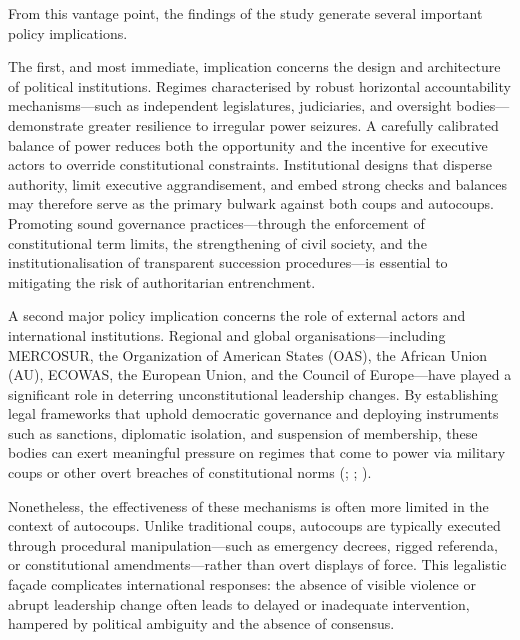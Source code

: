 \documentclass[
  12pt,
]{report}
\begin{document}
From this vantage point, the findings of the study generate several
important policy implications.

The first, and most immediate, implication concerns the design and
architecture of political institutions. Regimes characterised by robust
horizontal accountability mechanisms---such as independent legislatures,
judiciaries, and oversight bodies---demonstrate greater resilience to
irregular power seizures. A carefully calibrated balance of power
reduces both the opportunity and the incentive for executive actors to
override constitutional constraints. Institutional designs that disperse
authority, limit executive aggrandisement, and embed strong checks and
balances may therefore serve as the primary bulwark against both coups
and autocoups. Promoting sound governance practices---through the
enforcement of constitutional term limits, the strengthening of civil
society, and the institutionalisation of transparent succession
procedures---is essential to mitigating the risk of authoritarian
entrenchment.

A second major policy implication concerns the role of external actors
and international institutions. Regional and global
organisations---including MERCOSUR, the Organization of American States
(OAS), the African Union (AU), ECOWAS, the European Union, and the
Council of Europe---have played a significant role in deterring
unconstitutional leadership changes. By establishing legal frameworks
that uphold democratic governance and deploying instruments such as
sanctions, diplomatic isolation, and suspension of membership, these
bodies can exert meaningful pressure on regimes that come to power via
military coups or other overt breaches of constitutional norms
(;
;
).

Nonetheless, the effectiveness of these mechanisms is often more limited
in the context of autocoups. Unlike traditional coups, autocoups are
typically executed through procedural manipulation---such as emergency
decrees, rigged referenda, or constitutional amendments---rather than
overt displays of force. This legalistic façade complicates
international responses: the absence of visible violence or abrupt
leadership change often leads to delayed or inadequate intervention,
hampered by political ambiguity and the absence of consensus.
\end{document}
